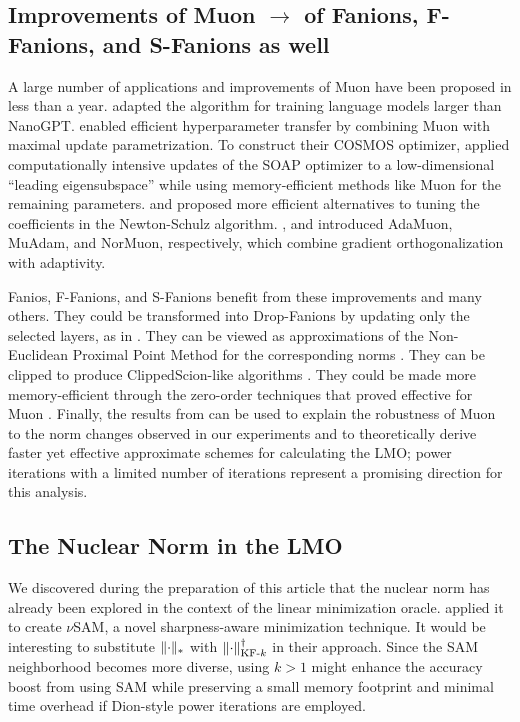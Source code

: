 \documentclass[pmlr]{jmlr}%
\DeclarePairedDelimiter{\normn}{\|}{\|_{*}}
\DeclarePairedDelimiter{\normkfk}{\|}{\|_{\text{KF-}k}}
\begin{document}
 \subsection{Improvements of Muon $\rightarrow$ of Fanions, F-Fanions, and S-Fanions as well}
 A large number of applications and improvements of Muon have been proposed in less than a year. \citet{liu2025muon} adapted the algorithm for training language models larger than NanoGPT. \citet{shah2025practical} enabled efficient hyperparameter transfer by combining Muon with maximal update parametrization. To construct their COSMOS optimizer, \citet{chen2025cosmoshybridadaptive} applied computationally intensive updates of the SOAP optimizer \citep{vyas2025soap} to a low-dimensional ``leading eigensubspace'' while using memory-efficient methods like Muon for the remaining parameters. \citet{amsel2025polar} and \citet{grishina2025chebyshev} proposed more efficient alternatives to tuning the coefficients in the Newton-Schulz algorithm. \citet{si2025adamuon}, \citet{veprikov2025preconditioned} and \citet{li2025normuon} introduced AdaMuon, MuAdam, and NorMuon, respectively, which combine gradient orthogonalization with adaptivity.

 Fanios, F-Fanions, and S-Fanions benefit from these improvements and many others. They could be transformed into Drop-Fanions by updating only the selected layers, as in \citep{gruntkowska2025dropmuon}. They can be viewed as approximations of the Non-Euclidean Proximal Point Method for the corresponding norms \citep{gruntkowska2025noneuclideanbroximal}. They can be clipped to produce ClippedScion-like algorithms \citep{pethick2025generalizedgradientnormclipping}. They could be made more memory-efficient through the zero-order techniques that proved effective for Muon \citep{petrov2025zeromuon}. Finally, the results from \citep{shulgin2025inexactmuon} can be used to explain the robustness of Muon to the norm changes observed in our experiments and to theoretically derive faster yet effective approximate schemes for calculating the LMO; power iterations with a limited number of iterations represent a promising direction for this analysis.
 
 \subsection{The Nuclear Norm in the LMO}
 
 We discovered during the preparation of this article that the nuclear norm has already been explored in the context of the linear minimization oracle. \citep{pethick2025sam} applied it to create $\nu$SAM, a novel sharpness-aware minimization technique. It would be interesting to substitute $\normn{\cdot}$ with $\normkfk{\cdot}^\dagger$ in their approach. Since the SAM neighborhood becomes more diverse, using $k > 1$ might enhance the accuracy boost from using SAM while preserving a small memory footprint and minimal time overhead if Dion-style power iterations are employed.
 
\end{document}
